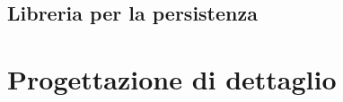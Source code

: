 \documentclass[10pt, a4paper]{article}
\begin{document}
\subsection{Libreria per la persistenza} %

\newpage

\section{Progettazione di dettaglio}
\end{document}
